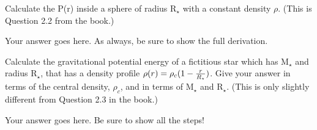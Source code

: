 \documentclass[12pt]{article}
\newenvironment{problem}[2][Problem]{\begin{trivlist}
\item[\hskip \labelsep {\bfseries #1}\hskip \labelsep {\bfseries #2.}]}{\end{trivlist}}
\newenvironment{answer}[2][Answer]{\begin{trivlist}
\item[\hskip \labelsep {\bfseries #1}\hskip \labelsep {\bfseries #2.}]}{\end{trivlist}}
\begin{document}
\begin{problem}{4}
Calculate the P(r) inside a sphere of radius R$_\star$ with a constant density $\rho$. (This is Question 2.2 from the book.)
\end{problem}

\begin{answer}{4}
Your answer goes here. As always, be sure to show the full derivation.
\end{answer}

\begin{problem}{5}
Calculate the gravitational potential energy of a fictitious star which has M$_\star$ and radius R$_\star$, that has a density profile $\rho(r) = {\rho_c (1 - {r \over R_\star})}$. Give your answer in terms of the central density, $\rho_c$, and in terms of M$_\star$ and R$_\star$. (This is only slightly different from Question 2.3 in the book.)
\end{problem}

\begin{answer}{5}
Your answer goes here. Be sure to show all the steps!
\end{answer}
 
\end{document}
